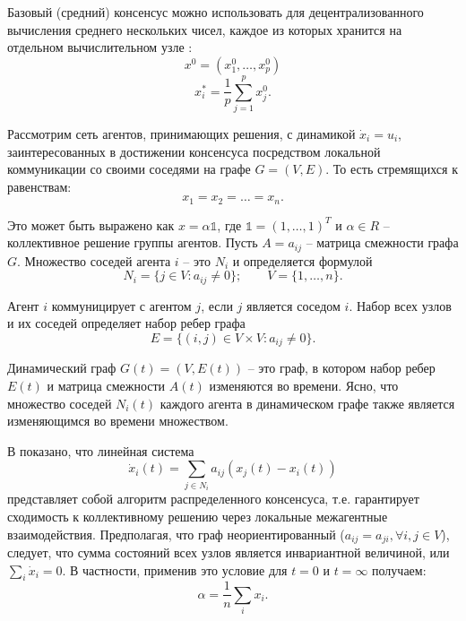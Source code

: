 \documentclass[a4paper,article,14pt]{extarticle}
\begin{document}
Базовый (средний) консенсус можно использовать для децентрализованного вычисления среднего нескольких чисел, каждое из которых хранится на отдельном вычислительном узле \cite{consensus_basics}:
\begin{equation}
x^0 = (x_1^0, \ldots, x_p^0)
\end{equation}
\begin{equation}
x_i^* = \frac{1}{p}\sum_{j=1}^{p}x_j^0.
\end{equation}

Рассмотрим сеть агентов, принимающих решения, с динамикой $\dot x_i = u_i$, заинтересованных в достижении консенсуса посредством локальной коммуникации со своими соседями на графе $G = (V, E)$.
То есть стремящихся к равенствам:
\begin{equation}
x_1 = x_2 = \ldots = x_n.
\end{equation}

Это может быть выражено как $x = \alpha \mathds{1} $, где $\mathds{1} = (1, \ldots, 1)^T$ и $\alpha \in R$ -- коллективное решение группы агентов. Пусть $A = a_{ij}$ -- матрица смежности графа $G$. Множество соседей агента $i$ -- это $N_i$ и определяется формулой
\begin{equation}
N_i = \{ j \in V: a_{ij} \ne 0 \}; \quad \quad V = \{1, \ldots, n\}.
\end{equation}

Агент $i$ коммуницирует с агентом $j$, если $j$ является соседом $i$. Набор всех узлов и их соседей определяет набор ребер графа
\begin{equation}
E = \{ (i,j) \in V\times V: a_{ij} \ne 0\}.
\end{equation}

Динамический граф $G(t) = (V, E(t))$ -- это граф, в котором набор ребер $E(t)$ и матрица смежности $A(t)$ изменяются во времени. Ясно, что множество соседей $N_i(t)$ каждого агента в динамическом графе также является изменяющимся во времени множеством.

В \cite{consensus_basics_2} показано, что линейная система
\begin{equation} \label{eq:system_dynamic}
\dot x_i(t) = \sum_{j \in N_i} a_{ij}(x_j(t)-x_i(t))
\end{equation}
представляет собой алгоритм распределенного консенсуса, т.е. гарантирует сходимость к коллективному решению через локальные межагентные взаимодействия. Предполагая, что граф неориентированный ($a_{ij}=a_{ji}, \forall i,j \in V$), следует, что сумма состояний всех узлов является инвариантной величиной, или $\sum_i \dot x_i = 0$. В частности, применив это условие для $t = 0 \text{ и } t = \infty$ получаем:
\begin{equation}
\alpha = \frac{1}{n}\sum_i x_i.
\end{equation}
\end{document}
